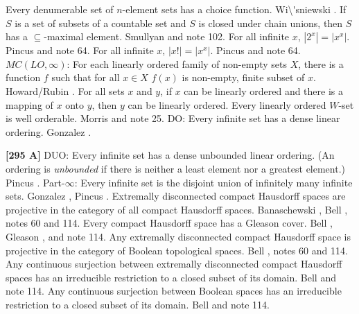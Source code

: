 Every denumerable set of $n$-element sets has a choice function.
\ac{Wi\'sniewski} \cite{1972}.
\medskip
{} If $S$ is a set of subsets of a countable set
and $S$ is closed under chain unions, then $S$ has a $\subseteq$-maximal
element.  \ac{Smullyan} \cite{1994} and note 102.
\medskip
{}  For all infinite $x$, $|2^x|=|x^x|$. \ac{Pincus}
\cite{1978} and note 64.
\medskip
{}  For all infinite $x$, $|x!|=|x^x|$. \ac{Pincus}
\cite{1978} and note 64.
\medskip
{} $MC(LO,\infty)$: For each linearly ordered family
of non-empty sets $X$, there is a function $f$ such that for all $x\in X$
$f(x)$ is non-empty, finite subset of $x$. \ac{Howard/Rubin} \cite{1977}.
\medskip
{}  For all sets $x$ and $y$, if $x$ can be
linearly ordered and there is a mapping of $x$ onto $y$, then
$y$ can be linearly ordered.
\medskip
{}  Every linearly ordered $W$-set is well
orderable.  \ac{Morris} \cite{1969} and note 25.
\medskip
{}  DO:  Every infinite set has a dense linear
ordering.  \ac{Gonzalez} \cite{1995a}.
\smallskip
\item{}{\bf [295 A]} DUO: Every infinite set has a dense unbounded linear
ordering. (An ordering is {\it unbounded} if there is neither a least
element nor a greatest element.)  \ac{Pincus} \cite{1997}.
\medskip
{} Part-$\infty$: Every infinite set is the disjoint
union of infinitely many infinite sets.  \ac{Gonzalez} \cite{1995b},
\ac{Pincus} \cite{1997}.
\medskip
{} Extremally disconnected compact Hausdorff spaces
are projective in the category of all compact Hausdorff spaces.
\ac{Banaschewski} \cite{1988}, \ac{Bell} \cite{1988}, notes 60 and 114.
\medskip
{} Every compact Hausdorff space has a Gleason cover.
\ac{Bell} \cite{1988}, \ac{Gleason} \cite{1958}, and note 114.
\medskip
{} Any extremally disconnected compact Hausdorff
space is projective in the category of Boolean topological spaces.
\ac{Bell} \cite{1988}, notes 60 and 114.
\medskip
{} Any continuous surjection between extremally
disconnected compact Hausdorff spaces has an irreducible restriction to
a closed subset of its domain.  \ac{Bell} \cite{1988} and note 114.
\medskip
{} Any continuous surjection between Boolean spaces
has an irreducible restriction to a closed subset of its domain.
\ac{Bell} \cite{1988} and note 114.
